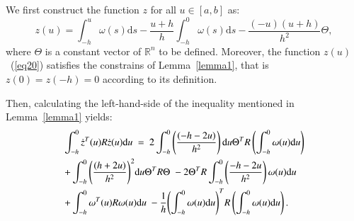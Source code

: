 \documentclass[journal]{IEEEtran}
\begin{document}
\begin{IEEEproof}
  We first construct the function $z$ for all $ u \in [a,b] $ as:
  \begin{equation}
    z(u) = \int_{ - h}^u {\omega (s){\text{d}}s}  - \frac{{u + h}}{h}\int_{ - h}^0 {\omega (s){\text{d}}s}  - \frac{{( - u)(u + h)}}{{{h^2}}}\Theta,
    \label{eq20}
  \end{equation}
  where $ \Theta  $ is a constant vector of $ {\mathbb{R}^n} $ to be defined. Moreover, the function $z\left(u\right)$~(\ref{eq20}) satisfies the constrains of Lemma~\ref{lemma1}, that is $ z(0) = z( - h) = 0 $ according to its definition.

Then, calculating the left-hand-side of the inequality mentioned in Lemma~\ref{lemma1} yields:
\begin{equation}
     \begin{gathered}
     \int_{ - h}^0 {{{\dot z}^T}(u)R\dot z(u){\text{d}}u}  =   2\int_{ - h}^0 {\left( {\frac{{( - h - 2u)}}{{{h^2}}}} \right){\text{d}}u} {\Theta ^T}R\left( {\int_{ - h}^0 {\omega (u){\text{d}}u} } \right) \hfill \\
    + \int_{ - h}^0 {{{\left( {\frac{{(h + 2u)}}{{{h^2}}}} \right)}^2}{\text{d}}u{\Theta ^T}R\Theta } \; - 2{\Theta ^T}R\int_{ - h}^0 {\left( {\frac{{ - h - 2u}}{{{h^2}}}} \right)\omega (u){\text{d}}u}  \hfill \\
     +\int_{ - h}^0 {{\omega ^T}(u)R\omega (u){\text{d}}u}  - \frac{1}{h}{\left( {\int_{ - h}^0 {\omega (u){\text{d}}u} } \right)^T}R\left( {\int_{ - h}^0 {\omega (u){\text{d}}u} } \right). \hfill \\
     \end{gathered}
     \label{eq21}
\end{equation}


\end{IEEEproof}
\end{document}
